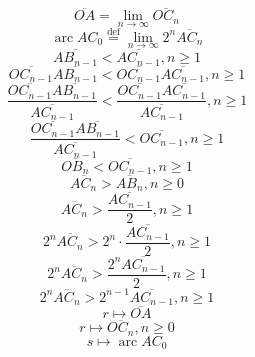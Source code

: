 \documentclass[a4paper,12pt]{report}
\DeclareMathOperator{\arc}{arc}
\begin{document}
\begin{equation}
\overline{OA} = \lim \limits_{n \to \infty} \overline{OC_n}
\end{equation}
\begin{equation}
\arc AC_0 \stackrel{\text{def}}{=} \lim \limits_{n \to \infty} 2^n \overline{AC_n}
\end{equation}
\begin{equation}
\overline{AB_{n-1}} < \overline{AC_{n-1}}, n \geq 1
\end{equation}
\begin{equation}
\overline{OC_{n-1}} \overline{AB_{n-1}} < \overline{OC_{n-1}} \overline{AC_{n-1}}, n \geq 1
\end{equation}
\begin{equation}
\frac{\overline{OC_{n-1}} \overline{AB_{n-1}}}{\overline{AC_{n-1}}} < \frac{\overline{OC_{n-1}} \overline{AC_{n-1}}}{\overline{AC_{n-1}}}, n \geq 1
\end{equation}
\begin{equation}
\frac{\overline{OC_{n-1}} \overline{AB_{n-1}}}{\overline{AC_{n-1}}} < \overline{OC_{n-1}}, n \geq 1
\end{equation}
\begin{equation}
\overline{OB_n} < \overline{OC_{n-1}}, n \geq 1
\end{equation}
\begin{equation}
\overline{AC_n} > \overline{AB_n}, n \geq 0
\end{equation}
\begin{equation}
\overline{AC_n} > \frac{\overline{AC_{n-1}}}{2}, n \geq 1
\end{equation}
\begin{equation}
2^n \overline{AC_n} > 2^n \cdot \frac{\overline{AC_{n-1}}}{2}, n \geq 1
\end{equation}
\begin{equation}
2^n \overline{AC_n} > \frac{2^n \overline{AC_{n-1}}}{2}, n \geq 1
\end{equation}
\begin{equation}
2^n \overline{AC_n} > 2^{n-1} \overline{AC_{n-1}}, n \geq 1
\end{equation}
\begin{equation}
r \mapsto \overline{OA}
\end{equation}
\begin{equation}
r \mapsto \overline{OC_{n}}, n \geq 0
\end{equation}
\begin{equation}
s \mapsto \arc AC_0
\end{equation}
\end{document}
